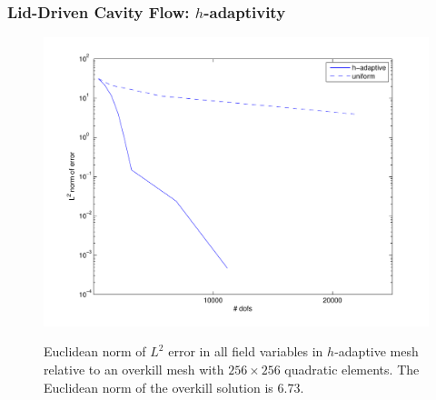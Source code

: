 \documentclass[mathserif]{beamer}
\begin{document}
\begin{frame}
\frametitle{Lid-Driven Cavity Flow: $h$-adaptivity}
\begin{figure}[!htb]
\begin{center}
{\setlength{\fboxsep}{1pt}\colorbox{pecos2}{\includegraphics[scale=0.40]{../figures/adaptive_cavity_flow_quadratic_vs_overkill.pdf}}}
\end{center}
\caption{Euclidean norm of $L^{2}$ error in all field variables in $h$-adaptive mesh relative to an overkill mesh with $256 \times 256$ quadratic elements.  The Euclidean norm of the overkill solution is 6.73.}
\end{figure}

\end{frame}
\end{document}
